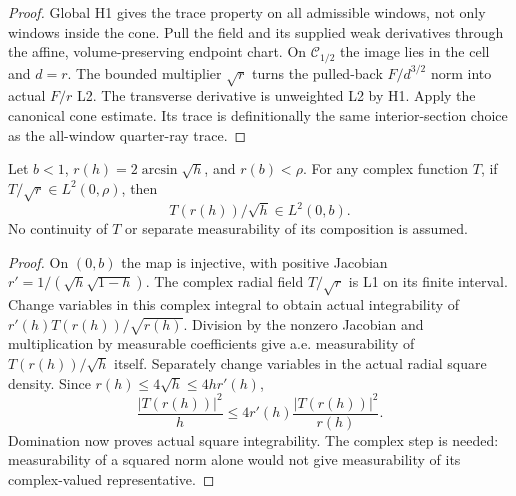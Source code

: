 \begin{proof}
\leanok
Global H1 gives the trace property on all admissible windows, not only
windows inside the cone.
Pull the field and its supplied weak derivatives through the affine,
volume-preserving endpoint chart.
On $\mathcal C_{1/2}$ the image lies in the cell and $d=r$.
The bounded multiplier $\sqrt r$ turns the pulled-back $F/d^{3/2}$ norm
into actual $F/r$ L2. The transverse derivative is unweighted L2 by H1.
Apply the canonical cone estimate. Its trace is definitionally the
same interior-section choice as the all-window quarter-ray trace.
\end{proof}

\begin{lemma}
\label{lem:gradient-endpoint-change-variables}
\leanok
Let $b<1$, $r(h)=2\arcsin\sqrt h$, and $r(b)<\rho$.
For any complex function $T$, if $T/\sqrt r\in L^2(0,\rho)$, then
\[
 T(r(h))/\sqrt h\in L^2(0,b).
\]
No continuity of $T$ or separate measurability of its composition is assumed.
\end{lemma}

\begin{proof}
\leanok
On $(0,b)$ the map is injective, with positive Jacobian
$r'=1/(\sqrt h\sqrt{1-h})$.
The complex radial field $T/\sqrt r$ is L1 on its finite interval.
Change variables in this complex integral to obtain actual integrability
of $r'(h)T(r(h))/\sqrt{r(h)}$.
Division by the nonzero Jacobian and multiplication by measurable
coefficients give a.e. measurability of $T(r(h))/\sqrt h$ itself.
Separately change variables in the actual radial square density.
Since $r(h)\le4\sqrt h\le4hr'(h)$,
\[
 \frac{|T(r(h))|^2}{h}
 \le4r'(h)\frac{|T(r(h))|^2}{r(h)}.
\]
Domination now proves actual square integrability.
The complex step is needed: measurability of a squared norm alone would
not give measurability of its complex-valued representative.
\end{proof}

